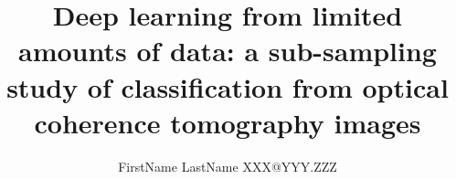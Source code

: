 \documentclass[twoside,11pt]{article}
\begin{document}
\title{Deep learning from limited amounts of data: a sub-sampling study of classification from optical coherence tomography images}



\author{\name FirstName LastName \email XXX@YYY.ZZZ}
\maketitle









\end{document}
